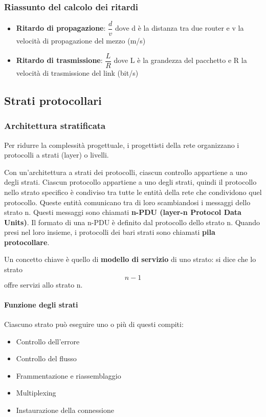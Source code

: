 \documentclass[11pt,a4paper]{article}
\begin{document}
\subsubsection{Riassunto del calcolo dei ritardi}
\begin{itemize}
	\item \textbf{Ritardo di propagazione}: $\dfrac{d}{v}$ dove d è la distanza tra due router e v la velocità di propagazione del mezzo (m/s)
	\item \textbf{Ritardo di trasmissione}: $\dfrac{L}{R}$ dove L è la grandezza del pacchetto e R la velocità di trasmissione del link (bit/s)
\end{itemize}

\subsection{Strati protocollari}
\subsubsection{Architettura stratificata}
Per ridurre la complessità progettuale, i progettisti della rete organizzano i protocolli a strati (layer) o livelli.

Con un'architettura a strati dei protocolli, ciascun controllo appartiene a uno degli strati. Ciascun protocollo appartiene a uno degli strati, quindi il protocollo nello strato specifico è condiviso tra tutte le entità della rete che condividono quel protocollo. Queste entità comunicano tra di loro scambiandosi i messaggi dello strato n. Questi messaggi sono chiamati \textbf{n-PDU (layer-n Protocol Data Units)}. Il formato di una n-PDU è definito dal protocollo dello strato n. Quando presi nel loro insieme, i protocolli dei bari strati sono chiamati \textbf{pila protocollare}.

Un concetto chiave è quello di \textbf{modello di servizio} di uno strato: si dice che lo strato $$n - 1$$ offre servizi allo strato n.
\paragraph{Funzione degli strati}
Ciascuno strato può eseguire uno o più di questi compiti:
\begin{itemize}
	\item Controllo dell’errore
	\item Controllo del flusso
	\item Frammentazione e riassemblaggio
	\item Multiplexing
	\item Instaurazione della connessione
\end{itemize}
\end{document}
